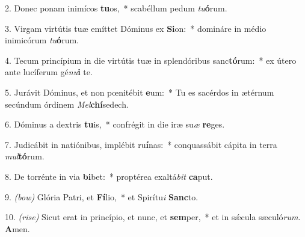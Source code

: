 2. Donec ponam inimícos \textbf{tu}os,~* scabéllum pedum \textit{tu}\textbf{ó}rum.

3. Virgam virtútis tuæ emíttet Dóminus ex \textbf{Si}on:~* domináre in médio inimicórum \textit{tu}\textbf{ó}rum.

4. Tecum princípium in die virtútis tuæ in splendóribus sanc\textbf{tó}rum:~* ex útero ante lucíferum gé\textit{nu}\textbf{i} te.

5. Jurávit Dóminus, et non p{\oe}nitébit \textbf{e}um:~* Tu es sacérdos in ætérnum secúndum órdinem \textit{Mel}\textbf{chí}sedech.

6. Dóminus a dextris \textbf{tu}is,~* confrégit in die iræ su\textit{æ} \textbf{re}ges.

7. Judicábit in natiónibus, implébit ru\textbf{í}nas:~* conquassábit cápita in terra \textit{mul}\textbf{tó}rum.

8. De torrénte in via \textbf{bi}bet:~* proptérea exaltá\textit{bit} \textbf{ca}put.

9. {\color{red}\textit{(bow)}} Glória Patri, et \textbf{Fí}lio,~* et Spirítu\textit{i} \textbf{Sanc}to.

10. {\color{red}\textit{(rise)}} Sicut erat in princípio, et nunc, et \textbf{sem}per,~* et in s\'{\ae}cula sæculó\textit{rum}. \textbf{A}men.
